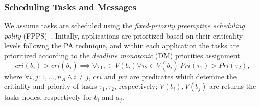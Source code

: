 {{%
%



\subsubsection{Scheduling Tasks and Messages}\label{subsec_response-time_analysis}
We assume tasks are scheduled using the \textit{fixed-priority preemptive scheduling polity} (FPPS)~\cite{Sha-RTS-2004}. Initally, applications are priortized based on their criticality levels followng the PA technique, and within each application the tasks are prioritized according to the \textit{deadline monotonic} (DM) priorities assignment. 
\[
cri(b_i)>cri(b_j)\implies \forall \tau_1,\in V(b_i)\forall \tau_2\in V(b_j)\ Pri(\tau_1)>Pri(\tau_2),
\]
where $\forall i,j:1,...,n_A\land i\neq j$, $cri$ and $pri$ are predicates which detemine the critiality and priority of tasks $\tau_1,\tau_2$, respectively; $V(b_i), V(b_j)$ are returns the tasks nodes, respectively for $b_i$ and $a_j$.

}}
